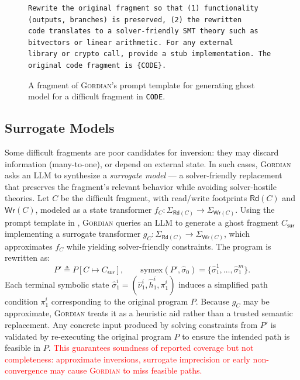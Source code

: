 \documentclass[acmsmall,screen,nonacm]{acmart}
\newcommand{\rev}[1]{\textcolor{red}{#1}}
\newcommand{\rev}[1]{#1}
\newcommand{\projName}{\textsc{Gordian}\xspace}
\theoremstyle{definition}
\begin{document}
\begin{figure}[t]
    \centering
        {\scriptsize
      \begin{tcolorbox}[mybox,title={Ghost Model Prompt Template}]
        \begin{verbatim}
Rewrite the original fragment so that (1) functionality (outputs, branches) is preserved, (2) the rewritten
code translates to a solver-friendly SMT theory such as bitvectors or linear arithmetic. For any external
library or crypto call, provide a stub implementation. The original code fragment is {CODE}.
      \end{verbatim}
      \end{tcolorbox}
        }
\vspace{-3mm}
\caption{\label{fig:model_template}A fragment of \projName's prompt template for generating ghost model for a difficult fragment in \texttt{CODE}.}
\vspace{-4mm}
\end{figure}

\subsection{Surrogate Models}
\label{sec:surrogate-models}

Some difficult fragments are poor candidates for inversion: they may discard information (many-to-one), or depend on external state. In such cases, \projName asks an LLM to synthesize a \emph{surrogate model} --- a solver-friendly replacement that preserves the fragment's relevant behavior while avoiding solver-hostile theories.
Let \(C\) be the difficult fragment, with read/write footprints
\(\mathsf{Rd}(C)\) and \(\mathsf{Wr}(C)\), modeled as a state transformer
\(f_C:\Sigma_{\mathsf{Rd}(C)} \to \Sigma_{\mathsf{Wr}(C)}\).
Using the prompt template in , \projName{} queries an
LLM to generate a ghost fragment \(C_{\mathsf{sur}}\) implementing a surrogate
transformer \(g_C:\Sigma_{\mathsf{Rd}(C)} \to \Sigma_{\mathsf{Wr}(C)}\), which
approximates \(f_C\) while yielding solver-friendly constraints.
The program is rewritten as:
\[
P' \triangleq P[C \mapsto C_{\mathsf{sur}}],
\qquad
\mathrm{symex}(P',\hat\sigma_0)=\{\hat\sigma_1^1,\ldots,\hat\sigma_1^m\}.
\]
Each terminal symbolic state
\(\hat\sigma_1^i=(\hat\nu_1^i,\hat h_1^i,\pi_1^i)\) induces a simplified path
condition \(\pi_1^i\) corresponding to the original program \(P\).
Because \(g_C\) may be approximate, \projName treats it as a heuristic aid rather than a trusted semantic replacement. Any concrete input produced by solving constraints from \(P'\) is validated by re-executing the original program \(P\) to ensure the intended path is feasible in \(P\). \rev{This guarantees soundness of reported coverage but not completeness: approximate inversions, surrogate imprecision or early non-convergence may cause \projName{} to miss feasible paths.}
\end{document}
